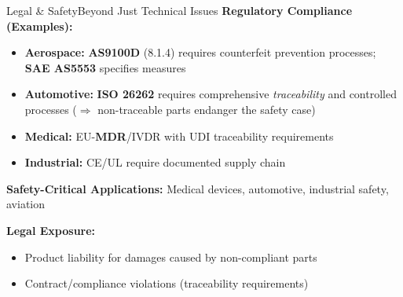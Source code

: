 \documentclass{beamer}
\begin{document}
\begin{frame}{Legal \& Safety}{Beyond Just Technical Issues}
	\textbf{Regulatory Compliance (Examples):}
	\begin{itemize}
		\item \textbf{Aerospace:} \textbf{AS9100D} (8.1.4) requires counterfeit prevention processes; \textbf{SAE AS5553} specifies measures
		\item \textbf{Automotive:} \textbf{ISO 26262} requires comprehensive \emph{traceability} and controlled processes 
		(\(\Rightarrow\) non-traceable parts endanger the safety case)
		\item \textbf{Medical:} EU-\textbf{MDR}/IVDR with UDI traceability requirements
		\item \textbf{Industrial:} CE/UL require documented supply chain
	\end{itemize}
	
	\medskip
	\textbf{Safety-Critical Applications:} Medical devices, automotive, industrial safety, aviation
	
	\medskip
	\textbf{Legal Exposure:}
	\begin{itemize}
		\item Product liability for damages caused by non-compliant parts
		\item Contract/compliance violations (traceability requirements)
	\end{itemize}
\end{frame}
\end{document}
